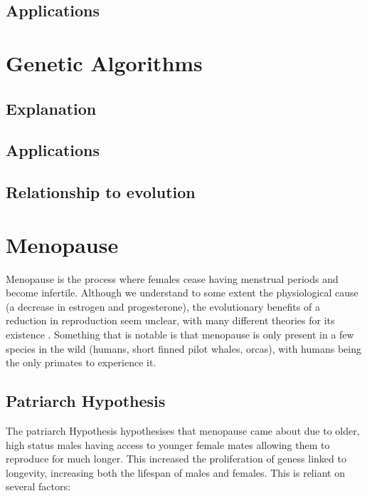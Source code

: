 \documentclass[authoryearcitations]{UoYCSproject}
\begin{document}
\subsection{Applications}

\section{Genetic Algorithms}

\subsection{Explanation}

\subsection{Applications}

\subsection{Relationship to evolution}

\newpage
\section{Menopause}
Menopause is the process where females cease having menstrual periods and become infertile. Although we understand to some extent the physiological cause (a decrease in estrogen and progesterone), the evolutionary benefits of a reduction in reproduction seem unclear, with many different theories for its existence \cite{evolutionPRLS2015}. Something that is notable is that menopause is only present in a few species in the wild (humans, short finned pilot whales, orcas), with humans being the only primates to experience it. 

\subsection{Patriarch Hypothesis}
The patriarch Hypothesis \cite{patriarchHypothesis2000} hypothesises that menopause came about due to older, high status males having access to younger female mates allowing them to reproduce for much longer. This increased the proliferation of geness linked to longevity, increasing both the lifespan of males and females. This is reliant on several factors: 
\end{document}
